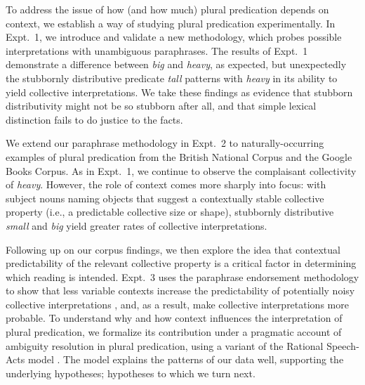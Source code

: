 \documentclass[linguex]{sp}
\begin{document}
To address the issue of how (and how much) plural predication depends on context, we establish a way of studying plural predication experimentally. In Expt.~1, we introduce and validate a new methodology, which probes possible interpretations with unambiguous paraphrases. The results of Expt.~1 demonstrate a difference between \emph{big} and \emph{heavy}, as expected, but unexpectedly the stubbornly distributive predicate \emph{tall} patterns with \emph{heavy} in its ability to yield collective interpretations. We take these findings as evidence that stubborn distributivity might not be so stubborn after all, and that simple lexical distinction fails to do justice to the facts. %

We extend our paraphrase methodology in Expt.~2 to naturally-occurring examples of plural predication from the British National Corpus and the Google Books Corpus. As in Expt.~1, we continue to observe the complaisant collectivity of \emph{heavy}. However, the role of context comes more sharply into focus: with subject nouns naming objects that suggest a contextually stable collective property (i.e., a predictable collective size or shape), stubbornly distributive \emph{small} and \emph{big} yield greater rates of collective interpretations. 

Following up on our corpus findings, we then explore the idea that contextual predictability of the relevant collective property is a critical factor in determining which reading is intended. Expt.~3 uses the paraphrase endorsement methodology to show that less variable contexts increase the predictability of potentially noisy collective interpretations%
, and, as a result, make collective interpretations more probable. To understand why and how context  influences the interpretation of plural predication, we formalize its contribution under a pragmatic account of ambiguity resolution in plural predication, using a variant of the Rational Speech-Acts model \citep[e.g.,][]{frankgoodman2012,lassitergoodman2013}. The model explains the patterns of our data well, supporting the underlying hypotheses; hypotheses to which we turn next.



\end{document}
